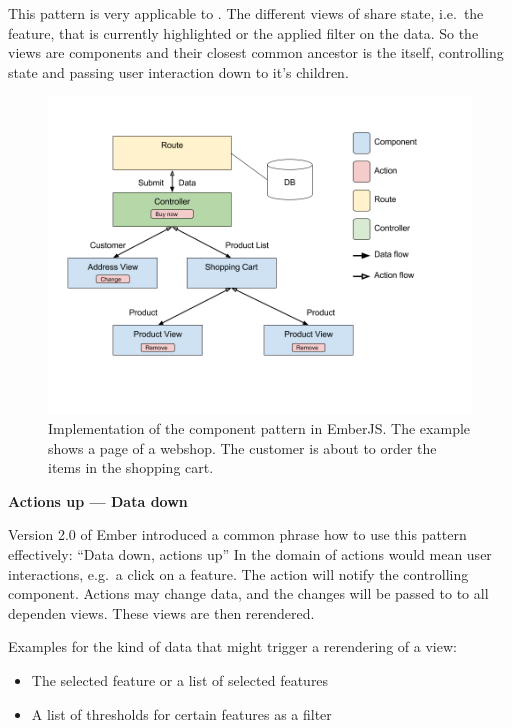 This pattern is very applicable to \cmvs{}.
The different views of \cmvs{} share state, i.e.\ the feature, that is currently highlighted or the applied filter on the data.
So the views are components and their closest common ancestor is the \cmv{} itself, controlling state and passing user interaction down to it's children.

\begin{figure}[h!]
  \centering
  \includegraphics[width=\textwidth]{images/data-down-actions-up.png}
  \caption{%
    Implementation of the component pattern in EmberJS\@.
    The example shows a page of a webshop.
    The customer is about to order the items in the shopping cart.
  }\label{fig:implementation:data-down-actions-up}
\end{figure}

\textbf{Actions up --- Data down}

Version 2.0 of Ember introduced a common phrase how to use this pattern effectively: ``Data down, actions up''\cite{Emberigniter2017}
In the domain of \cmvs{} actions would mean user interactions, e.g.\ a click on a feature.
The action will notify the controlling \cmv{} component.
Actions may change data, and the changes will be passed to to all dependen views.
These views are then rerendered.

Examples for the kind of data that might trigger a rerendering of a view:
\begin{itemize}
  \item
    The selected feature or a list of selected features
  \item
    A list of thresholds for certain features as a filter
\end{itemize}
